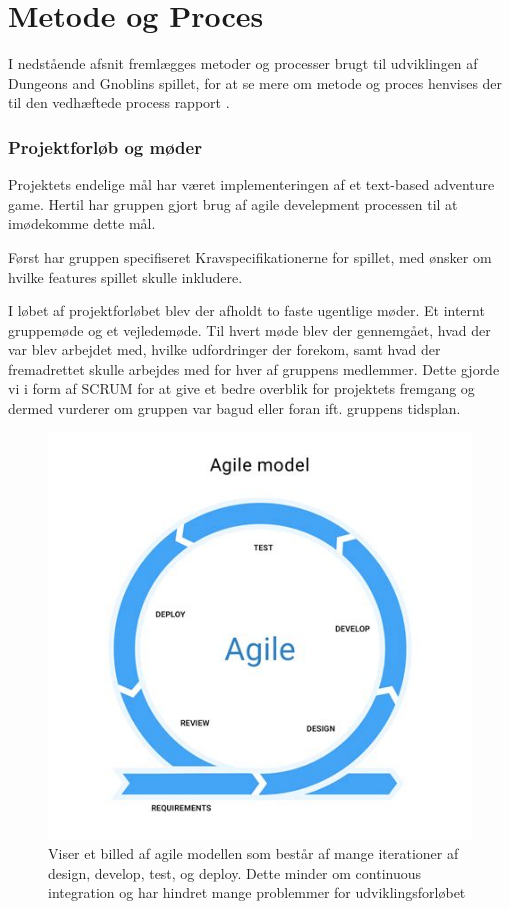 \section{Metode og Proces}
I nedstående afsnit fremlægges metoder og processer brugt til udviklingen af
Dungeons and Gnoblins spillet, for at se mere om metode og proces henvises der til den vedhæftede process rapport \parencite[Section 1][]{ProcessMetode}.

\subsubsection{Projektforløb og møder}
Projektets endelige mål har været implementeringen af et text-based adventure game.
Hertil har gruppen gjort brug af agile develepment processen til at imødekomme dette mål.

Først har gruppen specifiseret Kravspecifikationerne for spillet, med ønsker om
hvilke features spillet skulle inkludere.

I løbet af projektforløbet blev der afholdt to faste ugentlige møder. Et internt gruppemøde og et vejledemøde. Til hvert møde blev der gennemgået, hvad der var blev arbejdet med,
hvilke udfordringer der forekom, samt hvad der fremadrettet skulle arbejdes med for hver af gruppens medlemmer. 
Dette gjorde vi i form af SCRUM for at give et bedre overblik for projektets fremgang og dermed vurderer om gruppen var bagud eller foran ift. gruppens tidsplan.

\begin{figure}[H]
  \centering
  \includegraphics[scale=.5]{02-Body/Images/Agile.png}
  \caption{Viser et billed af agile modellen som består af mange iterationer
           af design, develop, test, og deploy. Dette minder om continuous integration
           og har hindret mange problemmer for udviklingsforløbet}
  \label{fig:Agile}
\end{figure}

